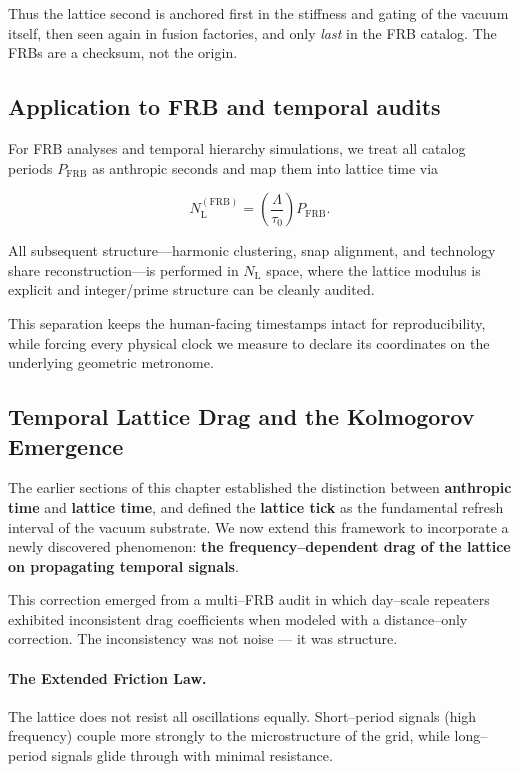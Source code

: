\documentclass[11pt, letterpaper, openany]{book}
\begin{document}
Thus the lattice second is anchored first in the stiffness and gating of the 
vacuum itself, then seen again in fusion factories, and only \emph{last} in the 
FRB catalog. The FRBs are a checksum, not the origin.


\subsection{Application to FRB and temporal audits}

For FRB analyses and temporal hierarchy simulations, we treat all catalog
periods $P_{\text{FRB}}$ as anthropic seconds and map them into lattice time via


\[
N_{\text{L}}^{(\text{FRB})} = \left( \frac{\Lambda}{\tau_0} \right) P_{\text{FRB}}.
\]



All subsequent structure---harmonic clustering, snap alignment, and technology
share reconstruction---is performed in $N_{\text{L}}$ space, where the lattice
modulus is explicit and integer/prime structure can be cleanly audited.

This separation keeps the human-facing timestamps intact for reproducibility,
while forcing every physical clock we measure to declare its coordinates on the
underlying geometric metronome.

\subsection{Temporal Lattice Drag and the Kolmogorov Emergence}

The earlier sections of this chapter established the distinction between \textbf{anthropic time} and 
\textbf{lattice time}, and defined the \textbf{lattice tick} as the fundamental refresh interval of the 
vacuum substrate. We now extend this framework to incorporate a newly discovered phenomenon:  
\textbf{the frequency--dependent drag of the lattice on propagating temporal signals}.

This correction emerged from a multi--FRB audit in which day--scale repeaters exhibited inconsistent 
drag coefficients when modeled with a distance--only correction. The inconsistency was not noise --- 
it was structure.

\paragraph{The Extended Friction Law.}

The lattice does not resist all oscillations equally.  
Short--period signals (high frequency) couple more strongly to the microstructure of the grid, while 
long--period signals glide through with minimal resistance.
\end{document}

